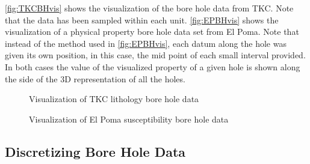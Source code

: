 \autoref{fig:TKCBHvis} shows the visualization of the bore hole data from TKC. Note that the data has been sampled within each unit.  \autoref{fig:EPBHvis} shows the visualization of a physical property bore hole data set from El Poma. Note that instead of the method used in \autoref{fig:EPBHvis}, each datum along the hole was given its own position, in this case, the mid point of each small interval provided. In both cases the value of the visualized property of a given hole is shown along the side of the 3D representation of all the holes.

 \begin{figure} [h]
    \centering
    \caption{Visualization of TKC lithology bore hole data}
    \label{fig:TKCBHvis}
\end{figure}

 \begin{figure} [h]
    \centering
    \caption{Visualization of El Poma susceptibility bore hole data}
    \label{fig:EPBHvis}
\end{figure}

\subsection{Discretizing Bore Hole Data}
\label{subsec:discBH}

